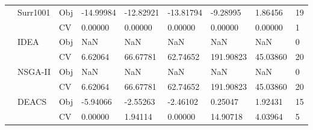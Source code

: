 \begin{table*}[!htb]
\begin{tabular}{lllllllll}
		& \multirow{2}{*}{Surr1001}          & Obj                                & -14.99984                          & -12.82921                          & -13.81794                            & -9.28995                            & 1.86456                           & 19               \\
		&                                    & CV                                 & 0.00000                            & 0.00000                            & 0.00000                              & 0.00000                             & 0.00000                           & 1                \\
		& \multirow{2}{*}{IDEA}              & Obj                                & NaN                                & NaN                                & NaN                                  & NaN                                 & NaN                               & 0                \\
		&                                    & CV                                 & 6.62064                            & 66.67781                           & 62.74652                             & 191.90823                           & 45.03860                          & 20               \\
		& \multirow{2}{*}{NSGA-II}           & Obj                                & NaN                                & NaN                                & NaN                                  & NaN                                 & NaN                               & 0                \\
		&                                    & CV                                 & 6.62064                            & 66.67781                           & 62.74652                             & 191.90823                           & 45.03860                          & 20               \\
		& \multirow{2}{*}{DEACS}             & Obj                                & -5.94066                           & -2.55263                           & -2.46102                             & 0.25047                             & 1.92431                           & 15               \\
		&                                    & CV                                 & 0.00000                            & 1.94114                            & 0.00000                              & 14.90718                            & 4.03964                           & 5                \\

\end{tabular}
\end{table*}
